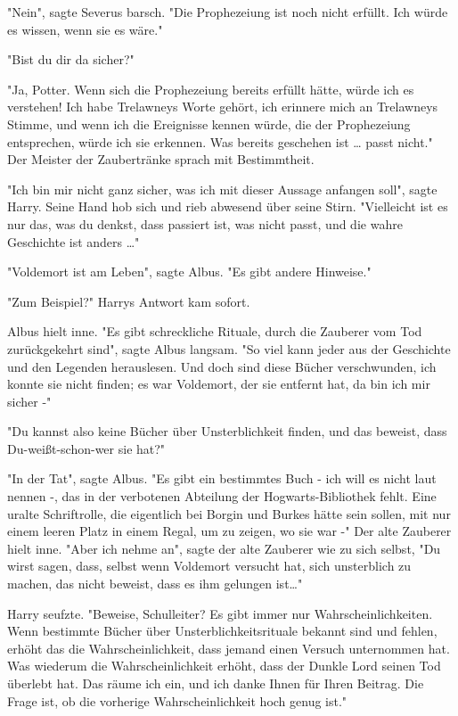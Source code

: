 {"Nein", sagte Severus barsch. "Die Prophezeiung ist noch nicht erfüllt. Ich würde es wissen, wenn sie es wäre."

"Bist du dir da sicher?"

"Ja, Potter. Wenn sich die Prophezeiung bereits erfüllt hätte, würde ich es verstehen! Ich habe Trelawneys Worte gehört, ich erinnere mich an Trelawneys Stimme, und wenn ich die Ereignisse kennen würde, die der Prophezeiung entsprechen, würde ich sie erkennen. Was bereits geschehen ist … passt nicht." Der Meister der Zaubertränke sprach mit Bestimmtheit.

"Ich bin mir nicht ganz sicher, was ich mit dieser Aussage anfangen soll", sagte Harry. Seine Hand hob sich und rieb abwesend über seine Stirn. "Vielleicht ist es nur das, was du denkst, dass passiert ist, was nicht passt, und die wahre Geschichte ist anders …"

"Voldemort ist am Leben", sagte Albus. "Es gibt andere Hinweise."

"Zum Beispiel?" Harrys Antwort kam sofort.

Albus hielt inne. "Es gibt schreckliche Rituale, durch die Zauberer vom Tod zurückgekehrt sind", sagte Albus langsam. "So viel kann jeder aus der Geschichte und den Legenden herauslesen. Und doch sind diese Bücher verschwunden, ich konnte sie nicht finden; es war Voldemort, der sie entfernt hat, da bin ich mir sicher -"

"Du kannst also keine Bücher über Unsterblichkeit finden, und das beweist, dass Du-weißt-schon-wer sie hat?"

"In der Tat", sagte Albus. "Es gibt ein bestimmtes Buch - ich will es nicht laut nennen -, das in der verbotenen Abteilung der Hogwarts-Bibliothek fehlt. Eine uralte Schriftrolle, die eigentlich bei Borgin und Burkes hätte sein sollen, mit nur einem leeren Platz in einem Regal, um zu zeigen, wo sie war -" Der alte Zauberer hielt inne. "Aber ich nehme an", sagte der alte Zauberer wie zu sich selbst, "Du wirst sagen, dass, selbst wenn Voldemort versucht hat, sich unsterblich zu machen, das nicht beweist, dass es ihm gelungen ist…"

Harry seufzte. "Beweise, Schulleiter? Es gibt immer nur Wahrscheinlichkeiten. Wenn bestimmte Bücher über Unsterblichkeitsrituale bekannt sind und fehlen, erhöht das die Wahrscheinlichkeit, dass jemand einen Versuch unternommen hat. Was wiederum die Wahrscheinlichkeit erhöht, dass der Dunkle Lord seinen Tod überlebt hat. Das räume ich ein, und ich danke Ihnen für Ihren Beitrag. Die Frage ist, ob die vorherige Wahrscheinlichkeit hoch genug ist."

}

